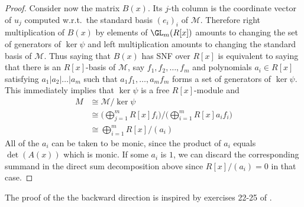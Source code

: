 \begin{proof}
Consider now the matrix $ B(x) $. Its  $ j$-th column is the coordinate vector of $ u_{j} $ computed w.r.t.\  the standard basis $ ( e_{i} )_{i} $ of  $ \mathcal {  M  } $. Therefore right multiplication of $ B(x) $ by elements of $ \GL_{m}(R[x]) $ amounts to changing the set of generators of $ \ker \psi      $    and left multiplication amounts to changing the  standard  basis of $   \mathcal{M} $. Thus saying that $ B(x) $ has SNF over $ R[x] $ is equivalent to saying that there is an $R[x]$-basis of $    \mathcal  {  M   } $, say $ f_{1}, f_{2}, \ldots, f_{m} $   and polynomials $ a_{i} \in R[x]  $ satisfying $ a_{1} | a_{2 }  | \ldots | a_{m}  $ such that $  a_{1} f_{1}, \ldots , a_{m}  f_{m} $ forms a set of generators   of $ \ker \psi $.  This immediately implies that $ \ker \psi $ is a free $R[x] $-module and        
\begin{align*}   M    &  \cong     \mathcal{M }      /  \ker \psi    \\     & \cong  \bigg ( \bigoplus_{j=1}^{m} R[x] f_{i}    \bigg ) \bigg /   \bigg ( \bigoplus_{i=1}^{m} R[x] a_{i} f_{i}  \bigg  )   \\ 
& \cong \bigoplus_{i=1}^{m}  R[x]/ (a_{i})                                                                           
 \end{align*} 
All of the $ a_{i} $ can be taken to be monic, since the product of $ a_{i} $ equals $ \det(A(x)) $ which is monic.  If some $ a_{i} $ is $ 1 $, we can discard  the corresponding summand in the direct sum  decomposition above since  $  R[x] /  (a_{i}) = 0    $ in that case.                                                                                    \end{proof}


\begin{remark} The proof of the the backward direction  is  inspired by exercises 22-25 of \cite[\S 2]{D&F}.   
\end{remark}       
 
